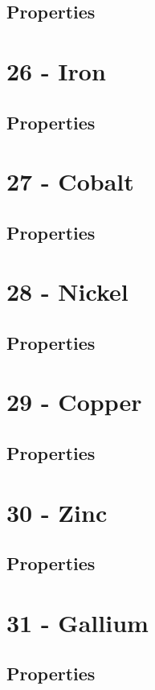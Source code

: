 \documentclass{book}
\begin{document}
\subsection{Properties}

\section{26 - Iron}
\label{sec:elem-iron}
\subsection{Properties}

\section{27 - Cobalt}
\label{sec:elem-cobalt}
\subsection{Properties}

\section{28 - Nickel}
\label{sec:elem-nickel}
\subsection{Properties}

\section{29 - Copper}
\label{sec:elem-copper}
\subsection{Properties}

\section{30 - Zinc}
\label{sec:elem-zinc}
\subsection{Properties}

\section{31 - Gallium}
\label{sec:elem-gallium}
\subsection{Properties}
\end{document}
